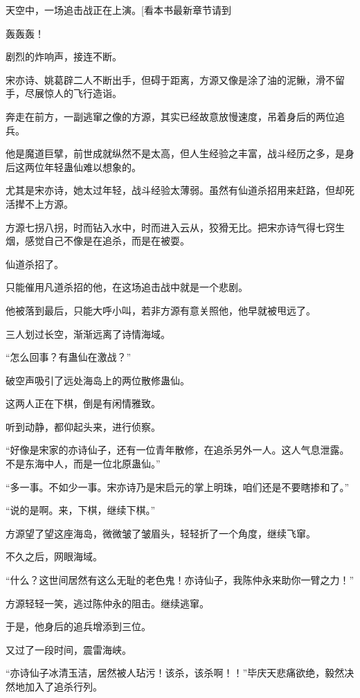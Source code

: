 
\begin{this_body}

天空中，一场追击战正在上演。[看本书最新章节请到

轰轰轰！

剧烈的炸响声，接连不断。

宋亦诗、姚葛辟二人不断出手，但碍于距离，方源又像是涂了油的泥鳅，滑不留手，尽展惊人的飞行造诣。

奔走在前方，一副逃窜之像的方源，其实已经故意放慢速度，吊着身后的两位追兵。

他是魔道巨擘，前世成就纵然不是太高，但人生经验之丰富，战斗经历之多，是身后这两位年轻蛊仙难以想象的。

尤其是宋亦诗，她太过年轻，战斗经验太薄弱。虽然有仙道杀招用来赶路，但却死活撵不上方源。

方源七拐八拐，时而钻入水中，时而进入云从，狡猾无比。把宋亦诗气得七窍生烟，感觉自己不像是在追杀，而是在被耍。

仙道杀招了。

只能催用凡道杀招的他，在这场追击战中就是一个悲剧。

他被落到最后，只能大呼小叫，若非方源有意关照他，他早就被甩远了。

三人划过长空，渐渐远离了诗情海域。

“怎么回事？有蛊仙在激战？”

破空声吸引了远处海岛上的两位散修蛊仙。

这两人正在下棋，倒是有闲情雅致。

听到动静，都仰起头来，进行侦察。

“好像是宋家的亦诗仙子，还有一位青年散修，在追杀另外一人。这人气息泄露。不是东海中人，而是一位北原蛊仙。”

“多一事。不如少一事。宋亦诗乃是宋启元的掌上明珠，咱们还是不要瞎掺和了。”

“说的是啊。来，下棋，继续下棋。”

方源望了望这座海岛，微微皱了皱眉头，轻轻折了一个角度，继续飞窜。

不久之后，网眼海域。

“什么？这世间居然有这么无耻的老色鬼！亦诗仙子，我陈仲永来助你一臂之力！”

方源轻轻一笑，逃过陈仲永的阻击。继续逃窜。

于是，他身后的追兵增添到三位。

又过了一段时间，震雷海峡。

“亦诗仙子冰清玉洁，居然被人玷污！该杀，该杀啊！！”毕庆天悲痛欲绝，毅然决然地加入了追杀行列。


\end{this_body}
